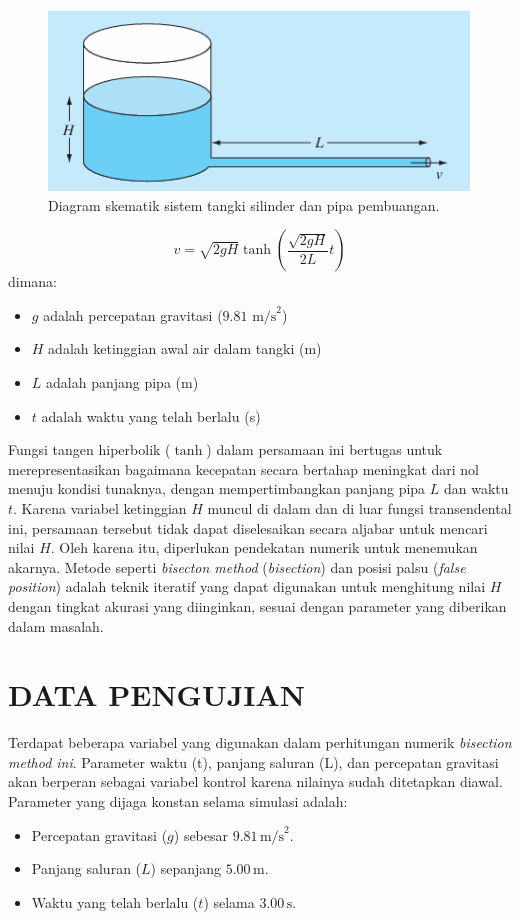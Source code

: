 \documentclass[conference]{IEEEtran}
\begin{document}
\begin{figure}[htbp]
  \centering
  \includegraphics[width=\columnwidth]{src/5.15.png}
  \caption{Diagram skematik sistem tangki silinder dan pipa pembuangan.}
  \label{fig:sistem_tangki}
\end{figure}

\begin{equation}
v = \sqrt{2gH} \tanh\left(\frac{\sqrt{2gH}}{2L}t\right)
\label{eq:kecepatan_air}
\end{equation}
dimana:
\begin{itemize}
    \item $g$ adalah percepatan gravitasi ($9.81 \text{ m/s}^2$) 
    \item $H$ adalah ketinggian awal air dalam tangki (m) 
    \item $L$ adalah panjang pipa (m) 
    \item $t$ adalah waktu yang telah berlalu (s) 
\end{itemize}

Fungsi tangen hiperbolik ($\tanh$) dalam persamaan ini bertugas untuk merepresentasikan bagaimana kecepatan secara bertahap meningkat dari nol menuju kondisi tunaknya, dengan mempertimbangkan panjang pipa $L$ dan waktu $t$. Karena variabel ketinggian $H$ muncul di dalam dan di luar fungsi transendental ini, persamaan tersebut tidak dapat diselesaikan secara aljabar untuk mencari nilai $H$. Oleh karena itu, diperlukan pendekatan numerik untuk menemukan akarnya. Metode seperti \textit{bisecton method} (\textit{bisection}) dan posisi palsu (\textit{false position}) adalah teknik iteratif yang dapat digunakan untuk menghitung nilai $H$ dengan tingkat akurasi yang diinginkan, sesuai dengan parameter yang diberikan dalam masalah.

\section{DATA PENGUJIAN}
Terdapat beberapa variabel yang digunakan dalam perhitungan numerik \textit{bisection method ini}. Parameter waktu (t), panjang saluran (L), dan percepatan gravitasi akan berperan sebagai variabel kontrol karena nilainya sudah ditetapkan diawal. Parameter yang dijaga konstan selama simulasi adalah:
\begin{itemize}
    \item Percepatan gravitasi ($g$) sebesar $9.81 \, \text{m/s}^2$.
    \item Panjang saluran ($L$) sepanjang $5.00 \, \text{m}$.
    \item Waktu yang telah berlalu ($t$) selama $3.00 \, \text{s}$.
\end{itemize}
\end{document}
